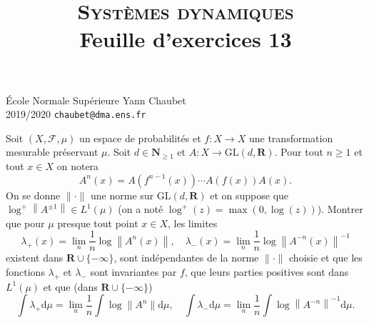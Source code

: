\documentclass[a4paper,10pt,openany]{article}
\title{\textsc{Syst\`emes dynamiques} \\ Feuille d'exercices 13}
\date{}
\author{}
\theoremstyle{plain}
\theoremstyle{definition}
\newcommand{\dd}{\mathrm{d}}
\newcommand{\R}{\mathbf{R}}
\newcommand{\N}{\mathbf{N}}
\begin{document}
{\noindent \'Ecole Normale Sup\'erieure  \hfill Yann Chaubet } \\
{2019/2020 \hfill \texttt{chaubet@dma.ens.fr}}

{\let\newpage\relax\maketitle}
\maketitle


 \vspace{1.5mm} 

\noindent Soit $(X, \mathscr{F}, \mu)$ un espace de probabilit\'es et $f : X \to X$ une transformation mesurable pr\'eservant $\mu$. Soit $d \in \N_{\geq 1}$ et $A : X \to \mathrm{GL}(d, \R)$. Pour tout $n \geq 1$ et tout $x \in X$ on notera
$$
A^n(x) = A(f^{n-1}(x)) \cdots A(f(x)) A(x).
$$
On se donne $\| \cdot \|$ une norme sur $\mathrm{GL}(d,\R)$ et on suppose que $\log^+ \left\|A^{\pm 1}\right\| \in L^1(\mu)$ (on a not\'e $\log^+(z) = \max(0, \log(z))$). Montrer que pour $\mu$ presque tout point $x \in X$, les limites
$$
\lambda_{+}(x) = \lim_n \frac{1}{n}\log \left \|A^{n}(x)\right\|, \quad \lambda_{-}(x) = \lim_n \frac{1}{n}\log \left \|A^{-n}(x)\right\|^{-1}
$$
existent dans $\R \cup \{-\infty\}$, sont ind\'ependantes de la norme $\| \cdot \|$ choisie et que les fonctions $\lambda_+$ et $\lambda_-$ sont invariantes par $f$, que leurs parties positives sont dans $L^1(\mu)$ et que (dans $\R \cup \{-\infty\}$)
$$
\int \lambda_+ \dd \mu = \lim_n \frac{1}{n} \int \log \|A^n\| \dd \mu, \quad \int \lambda_- \dd \mu = \lim_n \frac{1}{n} \int \log \left\|A^{-n}\right\|^{-1} \dd \mu.
$$
\vspace{0.6cm}



 \vspace{1.5mm}
\end{document}
